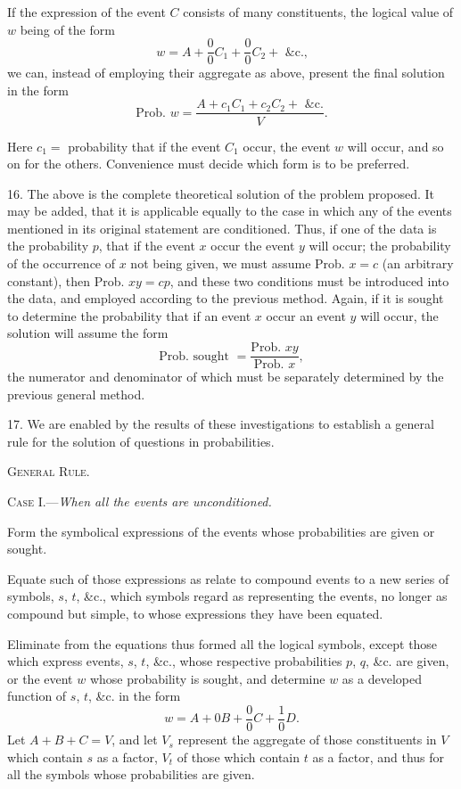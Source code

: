 \documentclass[oneside]{book}
\begin{document}
If the expression of the event $C$ consists of many constituents,
the logical value of $w$ being of the form
\[
  w = A + \frac{0}{0}C_1 + \frac{0}{0}C_2 + \text{ \&c.,}
\]
we can, instead of employing their aggregate as above, present
the final solution in the form
\[
  \textrm{Prob. } w = \frac{ A + c_1C_1 + c_2C_2 + \text{ \&c.} }{V}.
\]

Here $c_1 =$ probability that if the event $C_1$ occur, the event $w$ will
occur, and so on for the others. Convenience must decide which
form is to be preferred.

16. The above is the complete theoretical solution of the
problem proposed. It may be added, that it is applicable equally
to the case in which any of the events mentioned in its original
statement are conditioned. Thus, if one of the data is the probability $p$, that if the event $x$ occur the event $y$ will occur; the
probability of the occurrence of $x$ not being given, we must assume Prob. $x = c$ (an arbitrary constant), then Prob. $xy = cp$, and
these two conditions must be introduced into the data, and employed according to the previous method. Again, if it is sought
to determine the probability that if an event $x$ occur an event $y$
will occur, the solution will assume the form
\[
  \text{Prob. sought }=\frac{ \text{Prob. }xy }{ \text{Prob. }x },
\]
the numerator and denominator of which must be separately determined by the previous general method.

17. We are enabled by the results of these investigations to
establish a general rule for the solution of questions in probabilities.


\begin{center}\textsc{General Rule.}\end{center}

\textsc{Case I.}---\emph{When all the events are unconditioned.}

Form the symbolical expressions of the events whose probabilities are given or sought.

Equate such of those expressions as relate to compound events
to a new series of symbols, $s$, $t$, \&c., which symbols regard as representing the events, no longer as compound but simple, to
whose expressions they have been equated.

Eliminate from the equations thus formed all the logical symbols, except those which express events, $s$, $t$, \&c., whose respective
probabilities $p$, $q$, \&c. are given, or the event $w$ whose probability
is sought, and determine $w$ as a developed function of $s$, $t$, \&c.
in the form
\[
  w = A + 0B + \frac{0}{0}C + \frac{1}{0}D.
\]
Let $A + B + C = V$, and let $V_s$ represent the aggregate of
those constituents in $V$ which contain $s$ as a factor, $V_t$ of those
which contain $t$ as a factor, and thus for all the symbols whose
probabilities are given.
\end{document}
